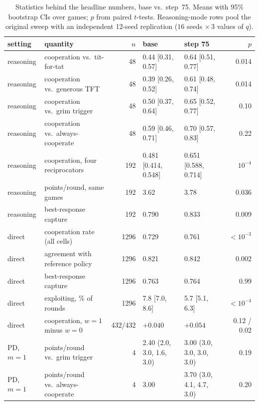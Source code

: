 \documentclass{article}
\begin{document}
\begin{table}[h]
\centering\small
\caption{Statistics behind the headline numbers, base vs.\ step~75. Means with
95\% bootstrap CIs over games; $p$ from paired $t$-tests. Reasoning-mode
rows pool the original sweep with an independent 12-seed replication ($16$ seeds $\times\,3$ values of $q$).}
\label{tab:stats}
\begin{tabular}{@{}llrllr@{}}
\toprule
setting & quantity & $n$ & base & step 75 & $p$ \\
\midrule
reasoning & cooperation vs.\ tit-for-tat & 48 & 0.44 [0.31, 0.57] & 0.64 [0.51, 0.77] & 0.014 \\
reasoning & cooperation vs.\ generous TFT & 48 & 0.39 [0.26, 0.52] & 0.61 [0.48, 0.74] & 0.014 \\
reasoning & cooperation vs.\ grim trigger & 48 & 0.50 [0.37, 0.64] & 0.65 [0.52, 0.77] & 0.10 \\
reasoning & cooperation vs.\ always-cooperate & 48 & 0.59 [0.46, 0.71] & 0.70 [0.57, 0.83] & 0.22 \\
reasoning & cooperation, four reciprocators & 192 & 0.481 [0.414, 0.548] & 0.651 [0.588, 0.714] & $10^{-4}$ \\
reasoning & points/round, same games & 192 & 3.62 & 3.78 & 0.036 \\
reasoning & best-response capture & 192 & 0.790 & 0.833 & 0.009 \\
direct & cooperation rate (all cells) & 1296 & 0.729 & 0.761 & $<10^{-3}$ \\
direct & agreement with reference policy & 1296 & 0.821 & 0.842 & 0.002 \\
direct & best-response capture & 1296 & 0.763 & 0.764 & 0.99 \\
direct & exploiting, \% of rounds & 1296 & 7.8 [7.0, 8.6] & 5.7 [5.1, 6.3] & $<10^{-4}$ \\
direct & cooperation, $w{=}1$ minus $w{=}0$ & 432/432 & $+0.040$ & $+0.054$ & 0.12 / 0.02 \\
PD, $m{=}1$ & points/round vs.\ grim trigger & 4 & 2.40 (2.0, 3.0, 1.6, 3.0) & 3.00 (3.0, 3.0, 3.0, 3.0) & 0.19 \\
PD, $m{=}1$ & points/round vs.\ always-cooperate & 4 & 3.00 & 3.70 (3.0, 4.1, 4.7, 3.0) & 0.20 \\
\bottomrule
\end{tabular}
\end{table}
\end{document}
